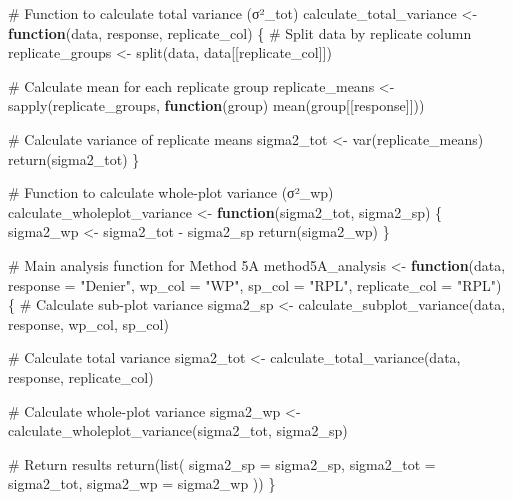 \documentclass[
  letterpaper,
  DIV=11,
  numbers=noendperiod]{scrartcl}
\newenvironment{Shaded}{\begin{snugshade}}{\end{snugshade}}
\newcommand{\AttributeTok}[1]{\textcolor[rgb]{0.40,0.45,0.13}{#1}}
\newcommand{\CommentTok}[1]{\textcolor[rgb]{0.37,0.37,0.37}{#1}}
\newcommand{\ControlFlowTok}[1]{\textcolor[rgb]{0.00,0.23,0.31}{\textbf{#1}}}
\newcommand{\FunctionTok}[1]{\textcolor[rgb]{0.28,0.35,0.67}{#1}}
\newcommand{\NormalTok}[1]{\textcolor[rgb]{0.00,0.23,0.31}{#1}}
\newcommand{\OtherTok}[1]{\textcolor[rgb]{0.00,0.23,0.31}{#1}}
\newcommand{\SpecialCharTok}[1]{\textcolor[rgb]{0.37,0.37,0.37}{#1}}
\newcommand{\StringTok}[1]{\textcolor[rgb]{0.13,0.47,0.30}{#1}}
\begin{document}
\begin{Shaded}
\begin{Highlighting}[]
\CommentTok{\# Function to calculate total variance (σ²\_tot)}
\NormalTok{calculate\_total\_variance }\OtherTok{\textless{}{-}} \ControlFlowTok{function}\NormalTok{(data, response, replicate\_col) \{}
  \CommentTok{\# Split data by replicate column}
\NormalTok{  replicate\_groups }\OtherTok{\textless{}{-}} \FunctionTok{split}\NormalTok{(data, data[[replicate\_col]])}
  
  \CommentTok{\# Calculate mean for each replicate group}
\NormalTok{  replicate\_means }\OtherTok{\textless{}{-}} \FunctionTok{sapply}\NormalTok{(replicate\_groups, }\ControlFlowTok{function}\NormalTok{(group) }\FunctionTok{mean}\NormalTok{(group[[response]]))}
  
  \CommentTok{\# Calculate variance of replicate means}
\NormalTok{  sigma2\_tot }\OtherTok{\textless{}{-}} \FunctionTok{var}\NormalTok{(replicate\_means)}
  \FunctionTok{return}\NormalTok{(sigma2\_tot)}
\NormalTok{\}}

\CommentTok{\# Function to calculate whole{-}plot variance (σ²\_wp)}
\NormalTok{calculate\_wholeplot\_variance }\OtherTok{\textless{}{-}} \ControlFlowTok{function}\NormalTok{(sigma2\_tot, sigma2\_sp) \{}
\NormalTok{  sigma2\_wp }\OtherTok{\textless{}{-}}\NormalTok{ sigma2\_tot }\SpecialCharTok{{-}}\NormalTok{ sigma2\_sp}
  \FunctionTok{return}\NormalTok{(sigma2\_wp)}
\NormalTok{\}}

\CommentTok{\# Main analysis function for Method 5A}
\NormalTok{method5A\_analysis }\OtherTok{\textless{}{-}} \ControlFlowTok{function}\NormalTok{(data, }\AttributeTok{response =} \StringTok{"Denier"}\NormalTok{, }\AttributeTok{wp\_col =} \StringTok{"WP"}\NormalTok{, }\AttributeTok{sp\_col =} \StringTok{"RPL"}\NormalTok{, }\AttributeTok{replicate\_col =} \StringTok{"RPL"}\NormalTok{) \{}
  \CommentTok{\# Calculate sub{-}plot variance}
\NormalTok{  sigma2\_sp }\OtherTok{\textless{}{-}} \FunctionTok{calculate\_subplot\_variance}\NormalTok{(data, response, wp\_col, sp\_col)}
  
  \CommentTok{\# Calculate total variance}
\NormalTok{  sigma2\_tot }\OtherTok{\textless{}{-}} \FunctionTok{calculate\_total\_variance}\NormalTok{(data, response, replicate\_col)}
  
  \CommentTok{\# Calculate whole{-}plot variance}
\NormalTok{  sigma2\_wp }\OtherTok{\textless{}{-}} \FunctionTok{calculate\_wholeplot\_variance}\NormalTok{(sigma2\_tot, sigma2\_sp)}
  
  \CommentTok{\# Return results}
  \FunctionTok{return}\NormalTok{(}\FunctionTok{list}\NormalTok{(}
    \AttributeTok{sigma2\_sp =}\NormalTok{ sigma2\_sp,}
    \AttributeTok{sigma2\_tot =}\NormalTok{ sigma2\_tot,}
    \AttributeTok{sigma2\_wp =}\NormalTok{ sigma2\_wp}
\NormalTok{  ))}
\NormalTok{\}}


\end{Highlighting}
\end{Shaded}
\end{document}

